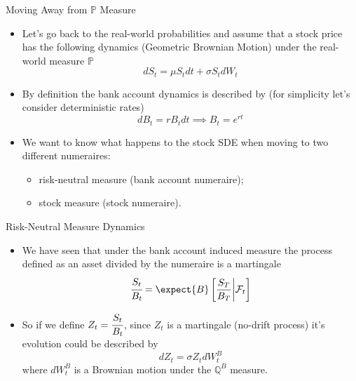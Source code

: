 \documentclass{beamer}
\begin{document}
\begin{frame}{Moving Away from $\mathbb{P}$ Measure}
  \begin{itemize}
  \item<1-> Let's go back to the real-world probabilities and assume that a stock price has the following dynamics (Geometric Brownian Motion) under the real-world measure $\mathbb{P}$
    \begin{equation*}
      dS_t = \mu S_t dt + \sigma S_t dW_t
    \end{equation*}
  \item<2-> By definition the bank account dynamics is described by (for simplicity let's consider deterministic rates)
    \begin{equation*}
      dB_t = rB_tdt\implies B_t = e^{rt}
    \end{equation*}
  \item<3-> We want to know what happens to the stock SDE when moving to two different numeraires:
    \begin{itemize}
    \item<4-> risk-neutral measure (bank account numeraire);
    \item<5-> stock measure (stock numeraire).
    \end{itemize}
  \end{itemize}
\end{frame}

\begin{frame}{Risk-Neutral Measure Dynamics}
  \begin{itemize}
  \item<1-> We have seen that under the bank account induced measure the process defined as an asset divided by the numeraire is a martingale
    \begin{equation*}
      \cfrac{S_t}{B_t} = \expect{B}\left[\frac{S_T}{B_T}\bigg|\mathcal{F}_t\right]
    \end{equation*}
  \item<2-> So if we define $Z_t=\cfrac{S_t}{B_t}$, since $Z_t$ is a martingale (no-drift process) it's evolution could be described by
    \begin{equation}
      dZ_t = \sigma Z_t dW_t^B
      \label{eq:z_martingale1}
    \end{equation}
    where $dW_t^B$ is a Brownian motion under the $\mathbb{Q}^B$ measure.
  \end{itemize}
\end{frame}
\end{document}
